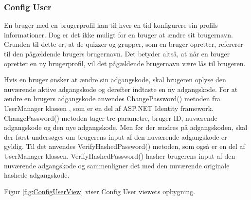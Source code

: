 \subsubsection{Config User}

En bruger med en brugerprofil kan til hver en tid konfigurere sin profils informationer. Dog er det ikke muligt for en bruger at ændre sit brugernavn. Grunden til dette er, at de quizzer og grupper, som en bruger opretter, refererer til den pågældende brugers brugernavn. Det betyder altså, at når en bruger opretter en ny brugerprofil, vil det pågældende brugernavn være lås til brugeren. 

Hvis en bruger ønsker at ændre sin adgangskode, skal brugeren oplyse den nuværende aktive adgangskode og derefter indtaste en ny adgangskode. For at ændre en brugers adgangskode anvendes ChangePassword() metoden fra UserManager klassen \citep{usermanager}, som er en del af ASP.NET Identity framework. ChangePassword() metoden tager tre parametre, bruger ID, nuværende adgangskode og den nye adgangskode. Men før der ændres på adgangskoden, skal der først undersøges om brugerens input af den nuværende adgangskode er gyldig. Til det anvendes VerifyHashedPassword() metoden, som også er en del af UserManager klassen. VerifyHashedPassword() hasher brugerens input af den nuværende adgangskode og sammenligner det med den nuværende originale hashede adgangskode. 

Figur \ref{fig:ConfigUserView} viser Config User viewets opbygning. 

